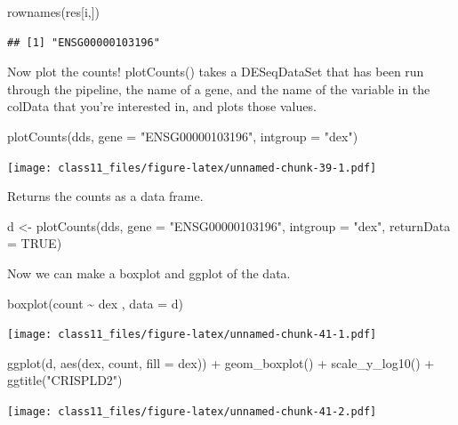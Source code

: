 \documentclass[
]{article}
\newenvironment{Shaded}{\begin{snugshade}}{\end{snugshade}}
\newcommand{\AttributeTok}[1]{\textcolor[rgb]{0.77,0.63,0.00}{#1}}
\newcommand{\ConstantTok}[1]{\textcolor[rgb]{0.00,0.00,0.00}{#1}}
\newcommand{\FunctionTok}[1]{\textcolor[rgb]{0.00,0.00,0.00}{#1}}
\newcommand{\NormalTok}[1]{#1}
\newcommand{\OtherTok}[1]{\textcolor[rgb]{0.56,0.35,0.01}{#1}}
\newcommand{\SpecialCharTok}[1]{\textcolor[rgb]{0.00,0.00,0.00}{#1}}
\newcommand{\StringTok}[1]{\textcolor[rgb]{0.31,0.60,0.02}{#1}}
\begin{document}
\begin{Shaded}
\begin{Highlighting}[]
\FunctionTok{rownames}\NormalTok{(res[i,])}
\end{Highlighting}
\end{Shaded}

\begin{verbatim}
## [1] "ENSG00000103196"
\end{verbatim}

Now plot the counts! plotCounts() takes a DESeqDataSet that has been run
through the pipeline, the name of a gene, and the name of the variable
in the colData that you're interested in, and plots those values.

\begin{Shaded}
\begin{Highlighting}[]
\FunctionTok{plotCounts}\NormalTok{(dds, }\AttributeTok{gene =} \StringTok{"ENSG00000103196"}\NormalTok{, }\AttributeTok{intgroup =} \StringTok{"dex"}\NormalTok{)}
\end{Highlighting}
\end{Shaded}

\texttt{[image: class11\_files/figure-latex/unnamed-chunk-39-1.pdf]}

Returns the counts as a data frame.

\begin{Shaded}
\begin{Highlighting}[]
\NormalTok{d }\OtherTok{\textless{}{-}} \FunctionTok{plotCounts}\NormalTok{(dds, }\AttributeTok{gene =} \StringTok{"ENSG00000103196"}\NormalTok{, }\AttributeTok{intgroup =} \StringTok{"dex"}\NormalTok{, }\AttributeTok{returnData =} \ConstantTok{TRUE}\NormalTok{)}
\end{Highlighting}
\end{Shaded}

Now we can make a boxplot and ggplot of the data.

\begin{Shaded}
\begin{Highlighting}[]
\FunctionTok{boxplot}\NormalTok{(count }\SpecialCharTok{\textasciitilde{}}\NormalTok{ dex , }\AttributeTok{data =}\NormalTok{ d)}
\end{Highlighting}
\end{Shaded}

\texttt{[image: class11\_files/figure-latex/unnamed-chunk-41-1.pdf]}

\begin{Shaded}
\begin{Highlighting}[]
\FunctionTok{ggplot}\NormalTok{(d, }\FunctionTok{aes}\NormalTok{(dex, count, }\AttributeTok{fill =}\NormalTok{ dex)) }\SpecialCharTok{+} 
  \FunctionTok{geom\_boxplot}\NormalTok{() }\SpecialCharTok{+} 
  \FunctionTok{scale\_y\_log10}\NormalTok{() }\SpecialCharTok{+} 
  \FunctionTok{ggtitle}\NormalTok{(}\StringTok{"CRISPLD2"}\NormalTok{)}
\end{Highlighting}
\end{Shaded}

\texttt{[image: class11\_files/figure-latex/unnamed-chunk-41-2.pdf]}
\end{document}
